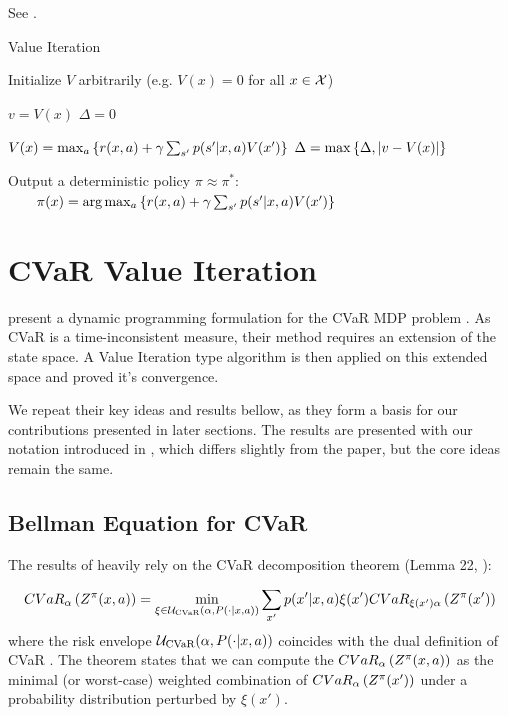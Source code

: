 See .


\begin{algorithm}
\caption{Value Iteration}
\label{alg:vi}
\begin{algorithmic}
    \STATE Initialize $V$ arbitrarily (e.g. $V(x)=0$ for all $x \in \mathcal{X}$)
    
	\REPEAT
	
	\STATE $v = V(x)$
	\STATE $\Delta = 0$
	
	\STATE $V(x) = \max_a\left\{ {r(x, a) + \gamma\sum_{s'}p(s'|x, a)V(x')} \right\}$
	\STATE $\Delta = \max\left\{ {\Delta, |v-V(x)|} \right\}$
	\ENDFOR
	
	\UNTIL{ $\Delta < \epsilon$ }
	
	\STATE Output a deterministic policy $\pi \approx \pi^*$:
   	\STATE $\quad\quad \pi(x) = \text{arg}\max_a\left\{ {r(x, a) + \gamma\sum_{s'}p(s'|x, a)V(x')} \right\}$
\end{algorithmic}
\end{algorithm}


\section{CVaR Value Iteration}\label{sec:vi:cvar}

\citet{chow2015risk} present a dynamic programming formulation for the CVaR MDP problem . As CVaR is a time-inconsistent measure, their method requires an extension of the state space. A Value Iteration type algorithm is then applied on this extended space and \citet{chow2015risk} proved it's convergence. 

We repeat their key ideas and results bellow, as they form a basis for our contributions presented in later sections. The results are presented with our notation introduced in , which differs slightly from the paper, but the core ideas remain the same.

\subsection{Bellman Equation for CVaR}

The results of \citet{chow2015risk} heavily rely on the CVaR decomposition theorem (Lemma 22, \citep{pflug2016time}):

%
\begin{equation}\label{eqn:cvardecomp}
CVaR_\alpha\left( {Z^\pi(x, a)} \right) = \min_{\xi \in \mathcal{U}_{\text{CVaR}}(\alpha, P(\cdot | x, a))} \sum_{x'} p(x'| x, a)\xi(x') CVaR_{\xi(x')\alpha}\left( {Z^\pi(x')} \right)
\end{equation}
%
where the risk envelope $\mathcal{U}_{\text{CVaR}}(\alpha, P(\cdot | x, a))$ coincides with the dual definition of CVaR .
The theorem states that we can compute the $CVaR_\alpha\left( {Z^\pi(x, a)} \right)$ as the minimal (or worst-case) weighted combination of $CVaR_\alpha\left( {Z^\pi(x')} \right)$ under a probability distribution perturbed by $\xi(x')$.

